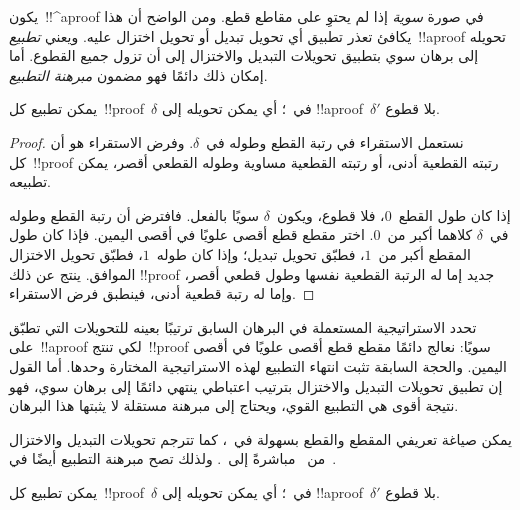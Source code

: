 \documentclass[../../../include/open-logic-section]{subfiles}
\begin{document}


يكون~!!^a{proof} في صورة \emph{سوية} إذا لم يحتوِ على مقاطع قطع. ومن
الواضح أن هذا يكافئ تعذر تطبيق أي تحويل تبديل أو تحويل اختزال عليه. ويعني
\emph{تطبيع}~!!a{proof} تحويله إلى برهان سوي بتطبيق تحويلات التبديل
والاختزال إلى أن تزول جميع القطوع. أما إمكان ذلك دائمًا فهو مضمون
\emph{مبرهنة التطبيع}.

\begin{thm}
يمكن تطبيع كل~!!{proof}~$\delta$ في~؛ أي يمكن تحويله إلى
!!a{proof}~$\delta'$ بلا قطوع.
\end{thm}

\begin{proof}
  نستعمل الاستقراء في رتبة القطع وطوله في~$\delta$. وفرض الاستقراء هو أن
  كل~!!{proof} رتبته القطعية أدنى، أو رتبته القطعية مساوية وطوله القطعي
  أقصر، يمكن تطبيعه.

  إذا كان طول القطع~$0$، فلا قطوع، ويكون~$\delta$ سويًا بالفعل. فافترض أن
  رتبة القطع وطوله في~$\delta$ كلاهما أكبر من~$0$. اختر مقطع قطع أقصى
  علويًا في أقصى اليمين. فإذا كان طول المقطع أكبر من~$1$، فطبّق تحويل
  تبديل؛ وإذا كان طوله~$1$، فطبّق تحويل الاختزال الموافق. ينتج عن ذلك
  !!{proof} جديد إما له الرتبة القطعية نفسها وطول قطعي أقصر، وإما له رتبة
  قطعية أدنى، فينطبق فرض الاستقراء.
\end{proof}

تحدد الاستراتيجية المستعملة في البرهان السابق ترتيبًا بعينه للتحويلات التي
تطبّق على~!!a{proof} لكي تنتج~!!{proof} سويًا: نعالج دائمًا مقطع قطع أقصى
علويًا في أقصى اليمين. والحجة السابقة تثبت انتهاء التطبيع لهذه الاستراتيجية
المختارة وحدها. أما القول إن تطبيق تحويلات التبديل والاختزال بترتيب اعتباطي
ينتهي دائمًا إلى برهان سوي، فهو نتيجة
أقوى هي التطبيع القوي، ويحتاج إلى مبرهنة مستقلة لا يثبتها هذا البرهان.

يمكن صياغة تعريفي المقطع والقطع بسهولة في~، كما تترجم تحويلات
التبديل والاختزال من~ مباشرةً إلى~. ولذلك تصح مبرهنة
التطبيع أيضًا في~.

\begin{thm}
يمكن تطبيع كل~!!{proof}~$\delta$ في~؛ أي يمكن تحويله إلى
!!a{proof}~$\delta'$ بلا قطوع.
\end{thm}
\end{document}
